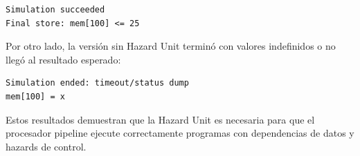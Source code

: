 \begin{verbatim}
Simulation succeeded
Final store: mem[100] <= 25
\end{verbatim}

Por otro lado, la versión sin Hazard Unit terminó con valores indefinidos o no llegó al resultado esperado:

\begin{verbatim}
Simulation ended: timeout/status dump
mem[100] = x
\end{verbatim}

Estos resultados demuestran que la Hazard Unit es necesaria para que el procesador pipeline ejecute correctamente programas con dependencias de datos y hazards de control.
